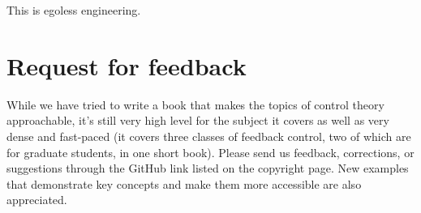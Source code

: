 This is egoless engineering.

\section{Request for feedback}

While we have tried to write a book that makes the topics of control theory
approachable, it's still very high level for the subject it covers as well as
very dense and fast-paced (it covers three classes of feedback control, two of
which are for graduate students, in one short book). Please send us feedback,
corrections, or suggestions through the GitHub link listed on the copyright
page. New examples that demonstrate key concepts and make them more accessible
are also appreciated.
